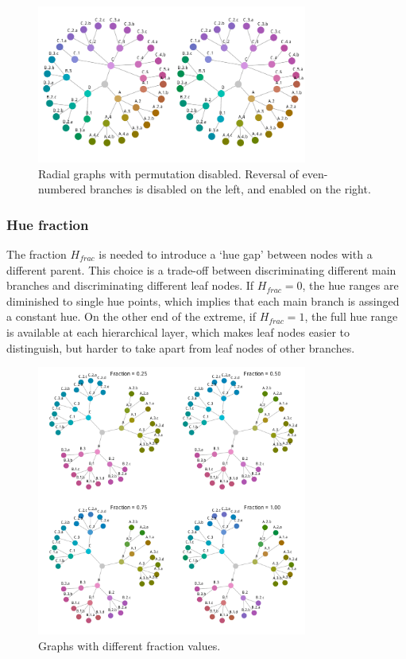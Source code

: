 \documentclass[journal]{vgtc}                %
\begin{document}
\begin{figure}[htb]

  \centering
  \includegraphics[width=3.5in]{HCPgraph2.pdf}
  \caption{Radial graphs with permutation disabled. Reversal of even-numbered branches is disabled on the left, and enabled on the right.}\label{fig:graph_noperm}

\end{figure}


\subsubsection{Hue fraction}\label{secf}

The fraction $H_{frac}$ is needed to introduce a `hue gap' between nodes with a different parent. This choice is a trade-off between discriminating different main branches and discriminating different leaf nodes. If $H_{frac}=0$, the hue ranges are diminished to single hue points, which implies that each main branch is assinged a constant hue. On the other end of the extreme, if $H_{frac}=1$, the full hue range is available at each hierarchical layer, which makes leaf nodes easier to distinguish, but harder to take apart from leaf nodes of other branches.

\begin{figure}[htb]
  \centering
  \includegraphics[width=3.5in]{Graph_hue.pdf}
  \caption{Graphs with different fraction values.}\label{fig:graphf}
\end{figure}
\end{document}

